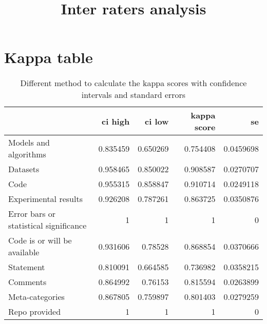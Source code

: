 \documentclass{article}
\title{Inter raters analysis}
\begin{document}
\maketitle

\section{Kappa table} 

\begin{table}[H]

\centering

\begin{tabular}{lrrrr}
\hline
                                        &   ci high &   ci low &   kappa score &        se \\
\hline
 Models and algorithms                  &  0.835459 & 0.650269 &      0.754408 & 0.0459698 \\
 Datasets                               &  0.958465 & 0.850022 &      0.908587 & 0.0270707 \\
 Code                                   &  0.955315 & 0.858847 &      0.910714 & 0.0249118 \\
 Experimental results                   &  0.926208 & 0.787261 &      0.863725 & 0.0350876 \\
 Error bars or statistical significance &  1        & 1        &      1        & 0         \\
 Code is or will be available           &  0.931606 & 0.78528  &      0.868854 & 0.0370666 \\
 Statement                              &  0.810091 & 0.664585 &      0.736982 & 0.0358215 \\
 Comments                               &  0.864992 & 0.76153  &      0.815594 & 0.0263899 \\
 Meta-categories                        &  0.867805 & 0.759897 &      0.801403 & 0.0279259 \\
 Repo provided                          &  1        & 1        &      1        & 0         \\
\hline
\end{tabular}\caption{Different method to calculate the kappa scores with confidence intervals and standard errors}

\end{table}
\end{document}
